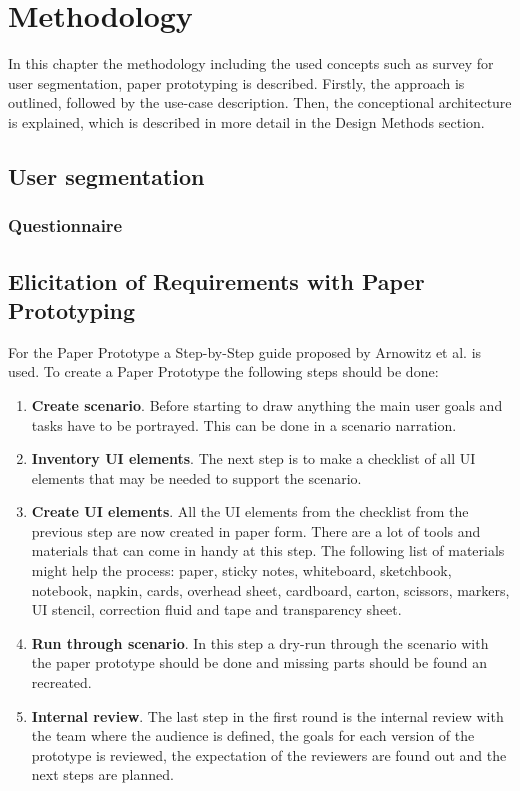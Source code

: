 \chapter{Methodology}

In this chapter the methodology including the used concepts such as survey for user segmentation, paper prototyping is described. Firstly, the approach is outlined, followed by the use-case description. Then, the conceptional architecture is explained, which is described in more detail in the Design Methods section.

\section{User segmentation}

\subsection{Questionnaire}


\section{Elicitation of Requirements with Paper Prototyping}
  For the Paper Prototype a Step-by-Step guide proposed by Arnowitz et al. \cite{arnowitz2010effective} is used. To create a Paper Prototype the following steps should be done:

\begin{enumerate}
	\item \textbf{Create scenario}. Before starting to draw anything the main user goals and tasks have to be portrayed. This can be done in a scenario narration.
	\item \textbf{Inventory UI elements}. The next step is to make a checklist of all UI elements that may be needed to support the scenario.
	\item \textbf{Create UI elements}. All the UI elements from the checklist from the previous step are now created in paper form. There are a lot of tools and materials that can come in handy at this step. The following list of materials might help the process: paper, sticky notes,
	whiteboard, sketchbook, notebook, napkin, cards, overhead sheet, cardboard, carton, scissors, markers, UI stencil, correction fluid and tape and transparency sheet. 
	\item \textbf{Run through scenario}. In this step a dry-run through the scenario with the paper prototype should be done and missing parts should be found an recreated.
	\item \textbf{Internal review}. The last step in the first round is the internal review with the team where the audience is defined, the goals for each version of the prototype is reviewed, the expectation of the reviewers are found out and the next steps are planned.
\end{enumerate}


